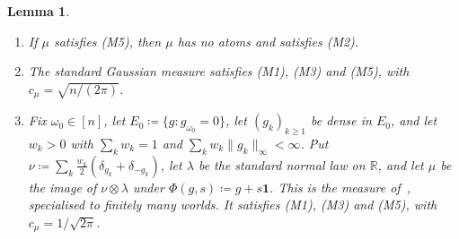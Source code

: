 \documentclass[11pt]{article}
\newtheorem{lemma}[theorem]{Lemma}
\theoremstyle{definition}
\newcommand{\R}{\mathbb R}
\newcommand{\one}{\mathbf 1}
\begin{document}
\begin{lemma}\label{lem:measures}
\begin{enumerate}[label=(\alph*)]
\item If $\mu$ satisfies (M5), then $\mu$ has no atoms and satisfies (M2).
\item The standard Gaussian measure satisfies (M1), (M3) and (M5), with $c_\mu=\sqrt{n/(2\pi)}$.
\item Fix $\omega_0\in[n]$, let $E_0\coloneqq\{g:g_{\omega_0}=0\}$, let $(g_k)_{k\ge1}$ be dense in $E_0$, and let $w_k>0$ with $\sum_kw_k=1$ and $\sum_kw_k\|g_k\|_\infty<\infty$. Put $\nu\coloneqq\sum_k\frac{w_k}2(\delta_{g_k}+\delta_{-g_k})$, let $\lambda$ be the standard normal law on $\R$, and let $\mu$ be the image of $\nu\otimes\lambda$ under $\Phi(g,s)\coloneqq g+s\one$. This is the measure of~\cite[Lemma~4.3]{App}, specialised to finitely many worlds. It satisfies (M1), (M3) and (M5), with $c_\mu=1/\sqrt{2\pi}$.
\end{enumerate}
\end{lemma}
\end{document}
